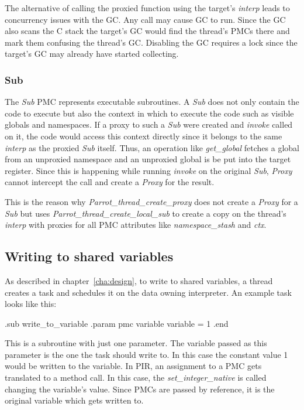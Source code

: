 \documentclass[bachelor,english]{hgbthesis}
\begin{document}
The alternative of calling the proxied function using the target's \textit{interp} leads to concurrency issues with the GC. Any call may cause GC to run. Since the GC also scans the C stack the target's GC would find the thread's PMCs there and mark them confusing the thread's GC. Disabling the GC requires a lock since the target's GC may already have started collecting.

\subsubsection{Sub}

The \textit{Sub} PMC represents executable subroutines. A \textit{Sub} does not only contain the code to execute but also the context in which to execute the code such as visible globals and namespaces. If a proxy to such a \textit{Sub} were created and \textit{invoke} called on it, the code would access this context directly since it belongs to the same \textit{interp} as the proxied \textit{Sub} itself. Thus, an operation like \textit{get\_global} fetches a global from an unproxied namespace and an unproxied global is be put into the target register. Since this is happening while running \textit{invoke} on the original \textit{Sub}, \textit{Proxy} cannot intercept the call and create a \textit{Proxy} for the result.

This is the reason why \textit{Parrot\_thread\_create\_proxy} does not create a \textit{Proxy} for a \textit{Sub} but uses \textit{Parrot\_thread\_create\_local\_sub} to create a copy on the thread's \textit{interp} with proxies for all PMC attributes like \textit{namespace\_stash} and \textit{ctx}.

\subsection{Writing to shared variables}

As described in chapter~\ref{cha:design}, to write to shared variables, a thread creates a task and schedules it on the data owning interpreter. An example task looks like this:
%
\begin{GenericCode}
.sub write_to_variable
    .param pmc variable
    variable = 1
.end
\end{GenericCode}
%
This is a subroutine with just one parameter. The variable passed as this parameter is the one the task should write to. In this case the constant value 1 would be written to the variable. In PIR, an assignment to a PMC gets translated to a method call. In this case, the \textit{set\_integer\_native} is called changing the variable's value. Since PMCs are passed by reference, it is the original variable which gets written to.
\end{document}
